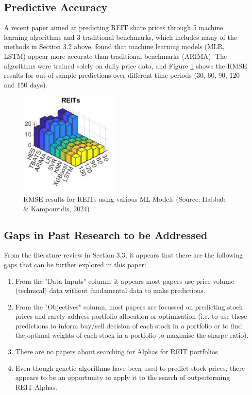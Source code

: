 \documentclass[a4paper,12pt]{report}
\numberwithin{equation}{section}
\theoremstyle{definition}
\begin{document}
\subsection{Predictive Accuracy}
A recent paper aimed at predicting REIT share prices through 5 machine learning algorithms and 3 traditional benchmarks, which includes many of the methods in Section 3.2 above, found that machine learning models (MLR, LSTM) appear more accurate than traditional benchmarks (ARIMA). The algorithms were trained solely on daily price data, and Figure \ref{fig:lit_review_rmse} shows the RMSE results for out-of sample predictions over different time periods (30, 60, 90, 120 and 150 days).


\begin{figure}[H]
  \centerline{\includegraphics[width=5cm]{lit_review_reit_rmse}}
  \caption{RMSE results for REITs using various ML Models (Source: Habbab \& Kampouridis, 2024)}
  \label{fig:lit_review_rmse}
\end{figure}


\subsection{Gaps in Past Research to be Addressed}
From the literature review in Section 3.3, it appears that there are the following gaps that can be further explored in this paper:
\begin{enumerate}

  \item {From the "Data Inputs" column, it appears most papers use price-volume (technical) data without fundamental data to make predictions.}
  \item {From the "Objectives" column, most papers are focussed on predicting stock prices and rarely address portfolio allocation or optimisation (i.e. to use these predictions to inform buy/sell decision of each stock in a portfolio or to find the optimal weights of each stock in a portfolio to maximise the sharpe ratio).}
  \item {There are no papers about searching for Alphas for REIT portfolios}
  \item {Even though genetic algorithms have been used to predict stock prices, there appears to be an opportunity to apply it to the search of outperforming REIT Alphas.}
  
\end{enumerate}
\end{document}
